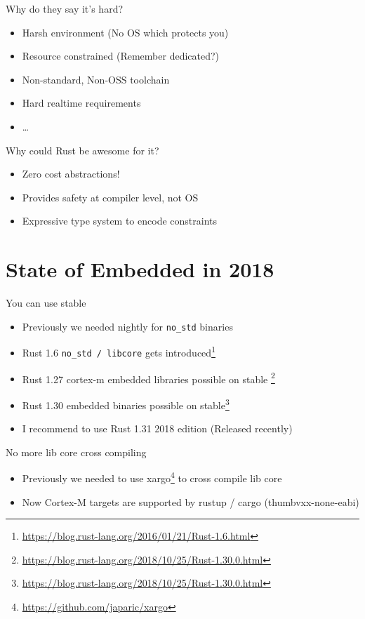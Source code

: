 \documentclass[aspectratio=1610,14pt,t]{beamer}
\begin{document}
\begin{frame}[c]{Why do they say it's hard?}
  \begin{itemize}
    \item Harsh environment (No OS which protects you)
    \item Resource constrained (Remember dedicated?)
    \item Non-standard, Non-OSS toolchain
    \item Hard realtime requirements
    \item \ldots
  \end{itemize}
\end{frame}

\begin{frame}[c]{Why could Rust be awesome for it?}
  \begin{itemize}
    \item Zero cost abstractions!
    \item Provides safety at compiler level, not OS
    \item Expressive type system to encode constraints
  \end{itemize}
\end{frame}

\section{State of Embedded in 2018}
\begin{frame}[c]{You can use stable}
  \begin{itemize}
    \item Previously we needed nightly for \texttt{no\_std} binaries
    \item Rust 1.6 \texttt{no\_std / libcore} gets
      introduced\footnote{\url{https://blog.rust-lang.org/2016/01/21/Rust-1.6.html}}
    \item Rust 1.27 cortex-m embedded libraries possible on stable
      \footnote{\url{https://blog.rust-lang.org/2018/10/25/Rust-1.30.0.html}}
    \item Rust 1.30 embedded binaries possible on
      stable\footnote{\url{https://blog.rust-lang.org/2018/10/25/Rust-1.30.0.html}}
    \item I recommend to use Rust 1.31 2018 edition (Released recently)
  \end{itemize}
\end{frame}

\begin{frame}[c]{No more lib core cross compiling}
  \begin{itemize}
    \item Previously we needed to use
      xargo\footnote{\url{https://github.com/japaric/xargo}} to cross compile
      lib core
    \item Now Cortex-M targets are supported by rustup / cargo
      (thumbvxx-none-eabi)
  \end{itemize}
\end{frame}
\end{document}
